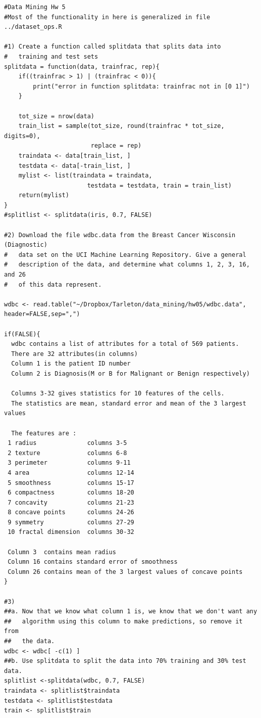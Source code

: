 \documentclass[11pt]{article}
\begin{document}
\begin{Verbatim}
#Data Mining Hw 5
#Most of the functionality in here is generalized in file ../dataset_ops.R

#1) Create a function called splitdata that splits data into 
#   training and test sets
splitdata = function(data, trainfrac, rep){
	if((trainfrac > 1) | (trainfrac < 0)){
		print("error in function splitdata: trainfrac not in [0 1]")
	}

	tot_size = nrow(data)
	train_list = sample(tot_size, round(trainfrac * tot_size, digits=0), 
	                    replace = rep)
	traindata <- data[train_list, ]
	testdata <- data[-train_list, ]
	mylist <- list(traindata = traindata, 
                       testdata = testdata, train = train_list)
    return(mylist)
}
#splitlist <- splitdata(iris, 0.7, FALSE)

#2) Download the file wdbc.data from the Breast Cancer Wisconsin (Diagnostic)
#   data set on the UCI Machine Learning Repository. Give a general 
#   description of the data, and determine what columns 1, 2, 3, 16, and 26 
#   of this data represent.

wdbc <- read.table("~/Dropbox/Tarleton/data_mining/hw05/wdbc.data",
header=FALSE,sep=",")

if(FALSE){
  wdbc contains a list of attributes for a total of 569 patients.
  There are 32 attributes(in columns)
  Column 1 is the patient ID number
  Column 2 is Diagnosis(M or B for Malignant or Benign respectively)

  Columns 3-32 gives statistics for 10 features of the cells. 
  The statistics are mean, standard error and mean of the 3 largest values 

  The features are : 
 1 radius              columns 3-5
 2 texture             columns 6-8
 3 perimeter           columns 9-11
 4 area                columns 12-14
 5 smoothness          columns 15-17
 6 compactness         columns 18-20
 7 concavity           columns 21-23
 8 concave points      columns 24-26
 9 symmetry            columns 27-29
 10 fractal dimension  columns 30-32

 Column 3  contains mean radius
 Column 16 contains standard error of smoothness
 Column 26 contains mean of the 3 largest values of concave points
}

#3) 
##a. Now that we know what column 1 is, we know that we don't want any 
##   algorithm using this column to make predictions, so remove it from 
##   the data. 
wdbc <- wdbc[ -c(1) ]
##b. Use splitdata to split the data into 70% training and 30% test data. 
splitlist <-splitdata(wdbc, 0.7, FALSE)
traindata <- splitlist$traindata
testdata <- splitlist$testdata
train <- splitlist$train


\end{Verbatim}
\end{document}
